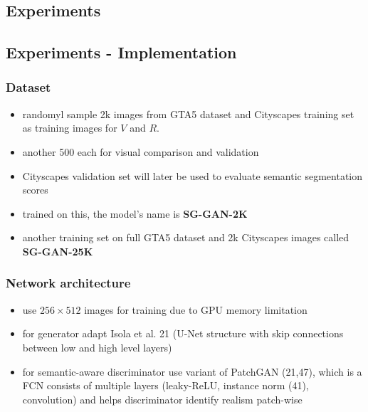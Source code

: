 \subsection{Experiments}

\subsection{Experiments - Implementation}

\subsubsection{Dataset}
\begin{itemize}
	\item randomyl sample 2k images from GTA5 dataset and Cityscapes training set as training images for $V$ and $R$.
	\item another 500 each for visual comparison and validation
	\item Cityscapes validation set will later be used to evaluate semantic segmentation scores
	\item trained on this, the model's name is \textbf{SG-GAN-2K}
	\item another training set on full GTA5 dataset and 2k Cityscapes images called \textbf{SG-GAN-25K}
\end{itemize}

\subsubsection{Network architecture}
\begin{itemize}
	\item use $256 \times 512$ images for training due to GPU memory limitation
	\item for generator adapt Isola et al. 21 (U-Net structure with skip connections between low and high level layers)
	\item for semantic-aware discriminator use variant of PatchGAN (21,47), which is a FCN consists of multiple layers (leaky-ReLU, instance norm (41), convolution) and helps discriminator identify realism patch-wise
\end{itemize}

